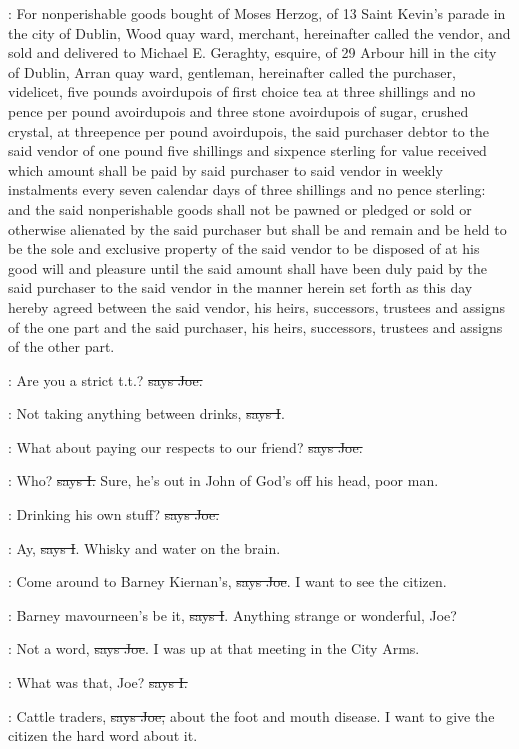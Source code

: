 :
For nonperishable goods bought of Moses Herzog, of 13 Saint
Kevin's parade in the city of Dublin, Wood quay ward, merchant,
hereinafter called the vendor, and sold and delivered to Michael E.
Geraghty, esquire, of 29 Arbour hill in the city of Dublin, Arran quay
ward, gentleman, hereinafter called the purchaser, videlicet, five pounds
avoirdupois of first choice tea at three shillings and no pence per pound
avoirdupois and three stone avoirdupois of sugar, crushed crystal, at
threepence per pound avoirdupois,
the said purchaser debtor to the said
vendor of one pound five shillings and sixpence sterling for value
received which amount shall be paid by said purchaser to said vendor in
weekly instalments every seven calendar days of three shillings and no
pence sterling: and the said nonperishable goods shall not be pawned or
pledged or sold or otherwise alienated by the said purchaser but shall be
and remain and be held to be the sole and exclusive property of the said
vendor to be disposed of at his good will and pleasure until the said
amount shall have been duly paid by the said purchaser to the said vendor
in the manner herein set forth as this day hereby agreed between the said
vendor, his heirs, successors, trustees and assigns of the one part
and
the said purchaser, his heirs, successors, trustees and assigns of the
other part.

\joe:
Are you a strict t.t.? \sout{says Joe.}

:
Not taking anything between drinks, \sout{says I}.

\joe:
What about paying our respects to our friend? \sout{says Joe.}

:
Who? \sout{says I.}
Sure, he's out in John of God's off his head, poor man.

\joe:
Drinking his own stuff? \sout{says Joe.}

:
Ay, \sout{says I}. Whisky and water on the brain.

\joe:
Come around to Barney Kiernan's, \sout{says Joe}.
I want to see the citizen.

:
Barney mavourneen's be it, \sout{says I}.
Anything strange or wonderful, Joe?

\joe:
Not a word, \sout{says Joe}.
I was up at that meeting in the City Arms.

:
What was that, Joe? \sout{says I.}

\joe:
Cattle traders, \sout{says Joe,}
about the foot and mouth disease. I want to
give the citizen the hard word about it.

